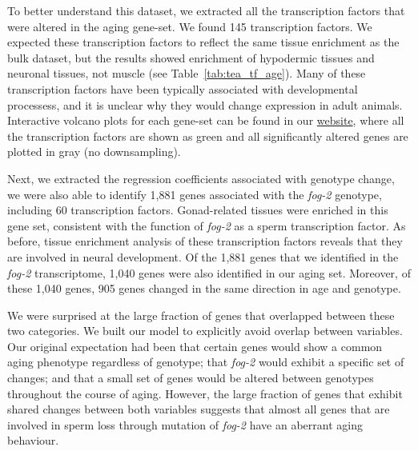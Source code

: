 \documentclass[9pt,twocolumn,twoside]{gsag3jnl}
\newcommand{\fog}{\emph{fog-2}}
\newcommand{\fogn}{1,881}
\newcommand{\coexpressed}{905}
\newcommand{\intersectn}{1,040}
\newcommand{\tfaging}{145}
\newcommand{\tffog}{60}
\newcommand{\webref}{\href{https://wormlabcaltech.github.io/Angeles_Leighton_2016/}{website}}
\begin{document}
To better understand this dataset, we extracted all the transcription factors that were altered in the aging gene-set. We found \tfaging{} transcription factors. We expected these transcription factors to reflect the same tissue enrichment as the bulk dataset, but the results showed enrichment of hypodermic tissues and neuronal tissues, not muscle (see Table~\ref{tab:tea_tf_age}). Many of these transcription factors have been typically associated with developmental processess, and it is unclear why they would change expression in adult animals. Interactive volcano plots for each gene-set can be found in our \webref{}, where all the transcription factors are shown as green and all significantly altered genes are plotted in gray (no downsampling).

Next, we extracted the regression coefficients associated with genotype change, we were also able to identify \fogn{} genes associated with the \fog{} genotype, including \tffog{} transcription factors. Gonad-related tissues were enriched in this gene set, consistent with the function of \fog{} as a sperm transcription factor. As before, tissue enrichment analysis of these transcription factors reveals that they are involved in neural development. Of the \fogn{} genes that we identified in the \fog{} transcriptome, \intersectn{} genes were also identified in our aging set. Moreover, of these \intersectn{}  genes, \coexpressed{} genes changed in the same direction in age and genotype.

We were surprised at the large fraction of genes that overlapped between these two categories. We built our model to explicitly avoid overlap between variables. Our original expectation had been that certain genes would show a common aging phenotype regardless of genotype; that \fog{} would exhibit a specific set of changes; and that a small set of genes would be altered between genotypes throughout the course of aging. However, the large fraction of genes that exhibit shared changes between both variables suggests that almost all genes that are involved in sperm loss through mutation of \fog{} have an aberrant aging behaviour.
\end{document}

